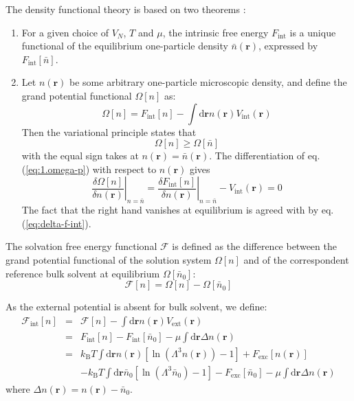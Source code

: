 The density functional theory is based on two theorems :
\begin{enumerate}
\item For a given choice of $V_{N}$, $T$ and $\mu$, the intrinsic free
energy $F_{\mathrm{int}}$ is a unique functional of the equilibrium
one-particle density $\bar{n}(\mathbf{r})$, expressed by $F_{\mathrm{int}}[\bar{n}]$.
\item Let $n(\mathbf{r})$ be some arbitrary one-particle microscopic density,
and define the grand potential functional $\varOmega[n]$ as:
\begin{equation}
\varOmega[n]=F_{\mathrm{int}}[n]-\int\mathrm{d}\mathbf{r}n(\mathbf{r})V_{\mathrm{int}}(\mathbf{r})\label{eq:1.omega-p}
\end{equation}
Then the variational principle states that
\begin{equation}
\varOmega[n]\geq\varOmega[\bar{n}]
\end{equation}
with the equal sign takes at $n(\mathbf{r})=\bar{n}(\mathbf{r})$.
The differentiation of eq. (\ref{eq:1.omega-p}) with respect to $n(\mathbf{r})$
gives
\begin{equation}
\left.\frac{\delta\varOmega[n]}{\delta n(\mathbf{r})}\right|_{n=\bar{n}}=\left.\frac{\delta F_{\mathrm{int}}[n]}{\delta n(\mathbf{r})}\right|_{n=\bar{n}}-V_{\mathrm{int}}(\mathbf{r})=0\label{eq:1.26}
\end{equation}
The fact that the right hand vanishes at equilibrium is agreed with by
eq. (\ref{eq:delta-f-int}).
\end{enumerate}
The solvation free energy functional $\mathcal{F}$ is defined as the difference between the grand potential functional
of the solution system $\varOmega[n]$ and of the correspondent reference
bulk solvent at equilibrium $\varOmega[\bar{n}_{0}]$:
\begin{equation}
\mathcal{F}[n]=\varOmega[n]-\varOmega[\bar{n}_{0}]\label{eq:1.def.functional}
\end{equation}

As the external potential is absent for bulk solvent, we define:
\begin{eqnarray}
\mathcal{F}_{\mathrm{int}}[n] & = & \mathcal{F}[n]-\int\mathrm{d}\mathbf{r}n(\mathbf{r})V_{\mathrm{ext}}(\mathbf{r})\\
 & = & F_{\mathrm{int}}[n]-F_{\mathrm{int}}[\bar{n}_{0}]-\mu\int\mathrm{d}\mathbf{r}\Delta n(\mathbf{r})\nonumber \\
 & = & k_{\mathrm{B}}T\int\mathrm{d}\mathbf{r}n(\mathbf{r})\left[\ln\left(\Lambda^{3}n(\mathbf{r})\right)-1\right]+F_{\mathrm{exc}}\left[n(\mathbf{r})\right]\\
 &  & -k_{\mathrm{B}}T\int\mathrm{d}\mathbf{r}\bar{n}_{0}\left[\ln\left(\Lambda^{3}\bar{n}_{0}\right)-1\right]-F_{\mathrm{exc}}\left[\bar{n}_{0}\right]-\mu\int\mathrm{d}\mathbf{r}\Delta n(\mathbf{r})\nonumber 
\end{eqnarray}
where $\Delta n(\mathbf{r})=n(\mathbf{r})-\bar{n}_{0}$.

